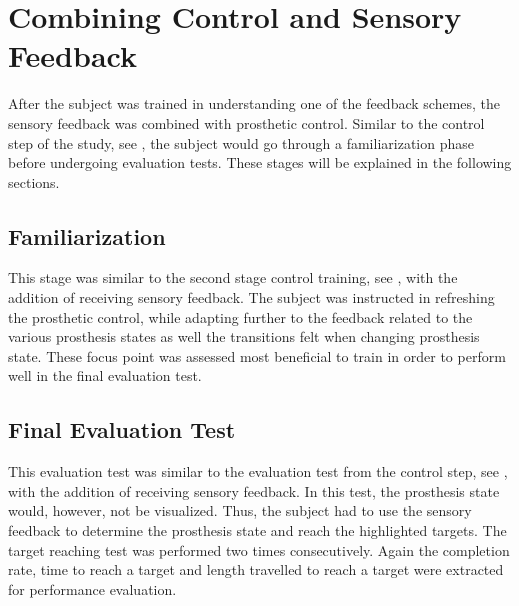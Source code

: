 \section{Combining Control and Sensory Feedback}
After the subject was trained in understanding one of the feedback schemes, the sensory feedback was combined with prosthetic control. Similar to the control step of the study, see , the subject would go through a familiarization phase before undergoing evaluation tests. These stages will be explained in the following sections.

\subsection{Familiarization}
This stage was similar to the second stage control training, see , with the addition of receiving sensory feedback. The subject was instructed in refreshing the prosthetic control, while adapting further to the feedback related to the various prosthesis states as well the transitions felt when changing prosthesis state. These focus point was assessed most beneficial to train in order to perform well in the final evaluation test. 

\subsection{Final Evaluation Test}
This evaluation test was similar to the evaluation test from the control step, see , with the addition of receiving sensory feedback. In this test, the prosthesis state would, however, not be visualized. Thus, the subject had to use the sensory feedback to determine the prosthesis state and reach the highlighted targets. The target reaching test was performed two times consecutively. Again the completion rate, time to reach a target and length travelled to reach a target were extracted for performance evaluation.